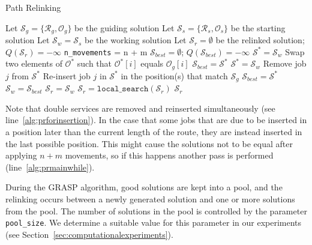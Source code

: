 \documentclass[a4paper,11pt,authoryear]{elsarticle}
\begin{document}
% 
\begin{algorithm}[h]
\caption{Path Relinking}
\label{alg:pathrelinking}
\begin{algorithmic}[1]
\State Let $\mathcal{S}_g = \{\mathcal{R}_g, \mathcal{O}_g\}$ be the guiding solution
\State Let $\mathcal{S}_s = \{\mathcal{R}_s, \mathcal{O}_s\}$ be the starting solution
\State Let $\mathcal{S}_w = \mathcal{S}_s$ be the working solution
\State Let $\mathcal{S}_r = \emptyset$ be the relinked solution;  $Q(\mathcal{S}_r) = -\infty$
\State \texttt{n\_movements} = n + m
 \label{alg:prmainwhile}
		\State $\mathcal{S}_{best} = \emptyset$; $Q(\mathcal{S}_{best}) = -\infty$
			\State $\mathcal{S}^* = \mathcal{S}_w$
				\State Swap two elements of $\mathcal{O}^*$ such that $\mathcal{O}^*[i]$ equals $\mathcal{O}_g[i]$
					\State $\mathcal{S}_{best} = \mathcal{S^*}$
				\EndIf
			\EndIf
		\EndFor %
			\State $\mathcal{S}^* = \mathcal{S}_w$
			\State Remove job $j$ from $\mathcal{S^*}$
			\State Re-insert job $j$ in $\mathcal{S^*}$ in the position(s) that match $\mathcal{S}_g$ \label{alg:prforinsertion}
				\State $\mathcal{S}_{best} = \mathcal{S^*}$
			\EndIf
		\EndFor %
		\State $\mathcal{S}_w = \mathcal{S}_{best}$
			\State $\mathcal{S}_r = \mathcal{S}_w$
		\EndIf
	\EndFor
\EndWhile
\State $\mathcal{S}_r = \texttt{local\_search}(\mathcal{S}_r)$
\Return $\mathcal{S}_r$
\end{algorithmic}
\end{algorithm}

Note that double services are removed and reinserted simultaneously (see line~\ref{alg:prforinsertion}). In the case that some jobs that are due to be inserted in a position later than the current length of the route, they are instead inserted in the last possible position. This might cause the solutions not to be equal after applying $n + m$ movements, so if this happens another pass is performed (line~\ref{alg:prmainwhile}).

During the GRASP algorithm, good solutions are kept into a pool, and the relinking occurs between a newly generated solution and one or more solutions from the pool.
The number of solutions in the pool is controlled by the parameter \texttt{pool\_size}. We determine a suitable value for this parameter in our experiments (see Section~\ref{sec:computationalexperiments}).
\end{document}
